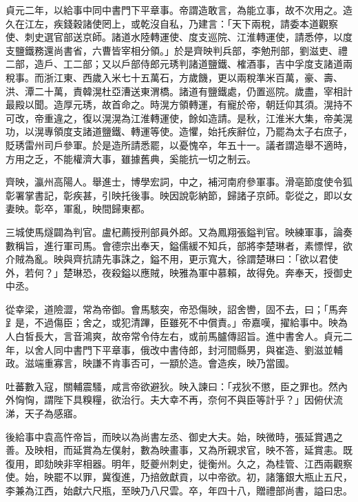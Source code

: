 \begin{pinyinscope}
 貞元二年，以給事中同中書門下平章事。帝謂造敢言，為能立事，故不次用之。造久在江左，疾錢穀諸使罔上，或乾沒自私，乃建言：「天下兩稅，請委本道觀察使、刺史選官部送京師。諸道水陸轉運使、度支巡院、江淮轉運使，請悉停，以度支鹽鐵務還尚書省，六曹皆宰相分領。」於是齊映判兵部，李勉刑部，劉滋吏、禮二部，造戶、工二部；又以戶部侍郎元琇判諸道鹽鐵、榷酒事，吉中孚度支諸道兩稅事。而浙江東、西歲入米七十五萬石，方歲饑，更以兩稅準米百萬，豪、壽、洪、潭二十萬，責韓滉杜亞漕送東渭橋。諸道有鹽鐵處，仍置巡院。歲盡，宰相計最殿以聞。造厚元琇，故首命之。時滉方領轉運，有寵於帝，朝廷仰其須。滉持不可改，帝重違之，復以滉滉為江淮轉運使，餘如造請。是秋，江淮米大集，帝美滉功，以滉專領度支諸道鹽鐵、轉運等使。造懼，始托疾辭位，乃罷為太子右庶子，貶琇雷州司戶參軍。於是造所請悉罷，以憂愧卒，年五十一。議者謂造舉不適時，方用之乏，不能權濟大事，雖據舊典，奚能抗一切之制云。



 齊映，瀛州高陽人。舉進士，博學宏詞，中之，補河南府參軍事。滑亳節度使令狐彰署掌書記，彰疾甚，引映托後事。映因說彰納節，歸諸子京師。彰從之，即以女妻映。彰卒，軍亂，映間歸東都。



 三城使馬燧闢為判官。盧杞薦授刑部員外郎。又為鳳翔張鎰判官。映練軍事，論奏數稱旨，進行軍司馬。會德宗出奉天，鎰儒緩不知兵，部將李楚琳者，素慓悍，欲介賊為亂。映與齊抗請先事誅之，鎰不用，更示寬大，徐謂楚琳曰：「欲以君使外，若何？」楚琳恐，夜殺鎰以應賊，映雅為軍中慕賴，故得免。奔奉天，授御史中丞。



 從幸梁，道險澀，常為帝御。會馬駭突，帝恐傷映，詔舍轡，固不去，曰；「馬奔𧾷是，不過傷臣；舍之，或犯清蹕，臣雖死不中償責。」帝嘉嘆，擢給事中。映為人白皙長大，言音鴻爽，故帝常令侍左右，或前馬臚傳詔旨。進中書舍人。貞元二年，以舍人同中書門下平章事，俄改中書侍郎，封河間縣男，與崔造、劉滋並輔政。滋端重寡言，映謙不肯事否可，一顓於造。會造疾，映乃當國。



 吐蕃數入寇，關輔震騷，咸言帝欲避狄。映入諫曰：「戎狄不懲，臣之罪也。然內外恟恟，謂陛下具糗糧，欲治行。夫大幸不再，奈何不與臣等計乎？」因俯伏流涕，天子為感寤。



 後給事中袁高忤帝旨，而映以為尚書左丞、御史大夫。始，映微時，張延賞遇之善。及映相，而延賞為左僕射，數為映畫事，又為所親求官，映不答，延賞恚。既復用，即劾映非宰相器。明年，貶夔州刺史，徙衡州。久之，為桂管、江西兩觀察使。始，映罷不以罪，冀復進，乃掊斂獻貢，以中帝欲。初，諸籓銀大瓶止五尺，李兼為江西，始獻六尺瓶，至映乃八尺雲。卒，年四十八，贈禮部尚書，謚曰忠。




\end{pinyinscope}
